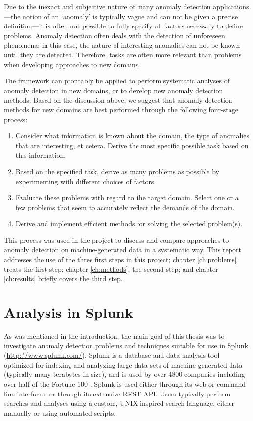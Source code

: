 Due to the inexact and subjective nature of many anomaly detection applications---the notion of an `anomaly' is typically vague and can not be given a precise definition---it is often not possible to fully specify all factors necessary to define problems. Anomaly detection often deals with the detection of unforeseen phenomena; in this case, the nature of interesting anomalies can not be known until they are detected. Therefore, tasks are often more relevant than problems when developing approaches to new domains.

The framework can profitably be applied to perform systematic analyses of anomaly detection in new domains, or to develop new anomaly detection methods. Based on the discussion above, we suggest that anomaly detection methods for new domains are best performed through the following four-stage process:
\begin{enumerate}
  \item Consider what information is known about the domain, the type of anomalies that are interesting, et cetera. Derive the most specific possible task based on this information.
  \item Based on the specified task, derive as many problems as possible by experimenting with different choices of factors.
  \item Evaluate these problems with regard to the target domain. Select one or a few problems that seem to accurately reflect the demands of the domain.
  \item Derive and implement efficient methods for solving the selected problem(s).
\end{enumerate}

This process was used in the project to discuss and compare approaches to anomaly detection on machine-generated data in a systematic way. This report addresses the use of the three first steps in this project; chapter \ref{ch:problems} treats the first step; chapter \ref{ch:methods}, the second step; and chapter \ref{ch:results} briefly covers the third step.

\section{Analysis in Splunk}
\label{sect:splunk}

As was mentioned in the introduction, the main goal of this thesis was to investigate anomaly detection problems and techniques suitable for use in Splunk (\url{http://www.splunk.com/}). Splunk is a database and data analysis tool optimized for indexing and analyzing large data sets of machine-generated data (typically many terabytes in size), and is used by over 4800 companies including over half of the Fortune 100 \cite{splunk}. Splunk is used either through its web or command line interfaces, or through its extensive REST API. Users typically perform searches and analyses using a custom, UNIX-inspired search language, either manually or using automated scripts.

